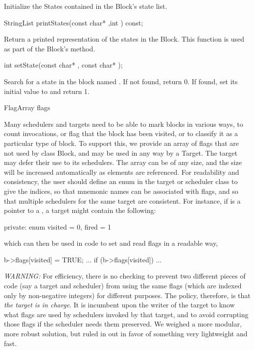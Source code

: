 Initialize the States contained in the Block's state list.

\begin{example}
StringList printStates(const char* ,int ) const;
\end{example}

Return a printed representation of the states in the Block.  This
function is used as part of the Block's  method.

\begin{example}
int setState(const char* , const char* );
\end{example}

Search for a state in the block named .  If not found,
return 0.  If found, set its initial value to  and
return 1.

\begin{example}
FlagArray flags
\end{example}

Many schedulers and targets need to be able to mark blocks
in various ways, to count invocations, or flag
that the block has been visited, or to classify it
as a particular type of block.  To support this,
we provide an array of flags that are not used
by class Block, and may be used in any way by a Target.
The target may defer their use to its schedulers.
The array can be of any size, and the size
will be increased automatically as elements are referenced.
For readability and consistency, the user should define an enum
in the target or scheduler class to give the indices,
so that mnemonic names
can be associated with flags, and so that multiple schedulers
for the same target are consistent.
For instance, if  is a pointer to a ,
a target might contain the following:
\begin{example}
private:
   enum {
      visited = 0,
      fired = 1
   }
\end{example}
which can then be used in code to set and read flags in a
readable way,
\begin{example}
   b->flags[visited] = TRUE;
   ...
   if (b->flags[visited]) { ... }
\end{example}

\emph{WARNING:} For efficiency, there is no checking to prevent
two different pieces of code (say a target and scheduler) from
using the same flags (which are indexed only by non-negative
integers) for different purposes.  The policy, therefore, is
that \emph{the target is in charge}.  It is incumbent upon
the writer of the target to know what flags are used by schedulers
invoked by that target, and to avoid corrupting those flags
if the scheduler needs them preserved.
We weighed a more modular, more robust solution, but ruled
in out in favor of something very lightweight and fast.


